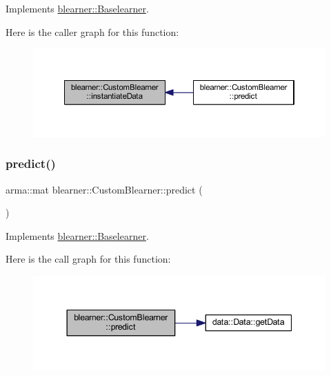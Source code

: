 Implements \mbox{\hyperlink{classblearner_1_1_baselearner_af01f1b8c4540927705ff79c3649489f7}{blearner\+::\+Baselearner}}.

Here is the caller graph for this function\+:\nopagebreak
\begin{figure}[H]
\begin{center}
\leavevmode
\includegraphics[width=350pt]{classblearner_1_1_custom_blearner_a18971368219f6948456b8e60c20b6968_icgraph}
\end{center}
\end{figure}
\mbox{\label{classblearner_1_1_custom_blearner_a20b5fe06512aa73478b9f934e1c81c31}} 
\subsubsection{\texorpdfstring{predict()}{predict()}\hspace{0.1cm}{\footnotesize\ttfamily [1/2]}}
{\footnotesize\ttfamily arma\+::mat blearner\+::\+Custom\+Blearner\+::predict (\begin{DoxyParamCaption}{ }\end{DoxyParamCaption})\hspace{0.3cm}{\ttfamily [virtual]}}



Implements \mbox{\hyperlink{classblearner_1_1_baselearner_ab37986047db43c84420fef2cef7fc20d}{blearner\+::\+Baselearner}}.

Here is the call graph for this function\+:\nopagebreak
\begin{figure}[H]
\begin{center}
\leavevmode
\includegraphics[width=344pt]{classblearner_1_1_custom_blearner_a20b5fe06512aa73478b9f934e1c81c31_cgraph}
\end{center}
\end{figure}
\mbox{\label{classblearner_1_1_custom_blearner_a401a479834eb3896260cb57b4551ceb4}} 
